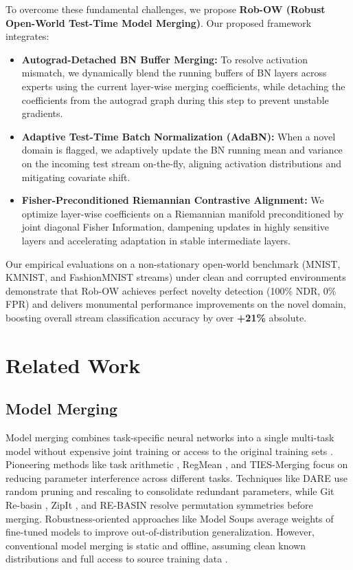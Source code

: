 \documentclass{article}
\begin{document}
To overcome these fundamental challenges, we propose \textbf{Rob-OW (Robust Open-World Test-Time Model Merging)}. Our proposed framework integrates:
\begin{itemize}
    \item \textbf{Autograd-Detached BN Buffer Merging:} To resolve activation mismatch, we dynamically blend the running buffers of BN layers across experts using the current layer-wise merging coefficients, while detaching the coefficients from the autograd graph during this step to prevent unstable gradients.
    \item \textbf{Adaptive Test-Time Batch Normalization (AdaBN):} When a novel domain is flagged, we adaptively update the BN running mean and variance on the incoming test stream on-the-fly, aligning activation distributions and mitigating covariate shift.
    \item \textbf{Fisher-Preconditioned Riemannian Contrastive Alignment:} We optimize layer-wise coefficients on a Riemannian manifold preconditioned by joint diagonal Fisher Information, dampening updates in highly sensitive layers and accelerating adaptation in stable intermediate layers.
\end{itemize}

Our empirical evaluations on a non-stationary open-world benchmark (MNIST, KMNIST, and FashionMNIST streams) under clean and corrupted environments demonstrate that Rob-OW achieves perfect novelty detection (100\% NDR, 0\% FPR) and delivers monumental performance improvements on the novel domain, boosting overall stream classification accuracy by over \textbf{+21\%} absolute.

\section{Related Work}
\label{sec:related}

\subsection{Model Merging}
Model merging combines task-specific neural networks into a single multi-task model without expensive joint training or access to the original training sets \cite{matena2022merging, ilharco2023editing, yadav2023ties}. Pioneering methods like task arithmetic \cite{ilharco2023editing}, RegMean \cite{jin2023regmean}, and TIES-Merging \cite{yadav2023ties} focus on reducing parameter interference across different tasks. Techniques like DARE \cite{yu2023dare} use random pruning and rescaling to consolidate redundant parameters, while Git Re-basin \cite{ainsworth2023git}, ZipIt \cite{stoica2024zipit}, and RE-BASIN \cite{jordan2022rebasin} resolve permutation symmetries before merging. Robustness-oriented approaches like Model Soups \cite{wortsman2022robust} average weights of fine-tuned models to improve out-of-distribution generalization. However, conventional model merging is static and offline, assuming clean known distributions and full access to source training data \cite{mcmahan2017communication, shumailov2024model}.
\end{document}
